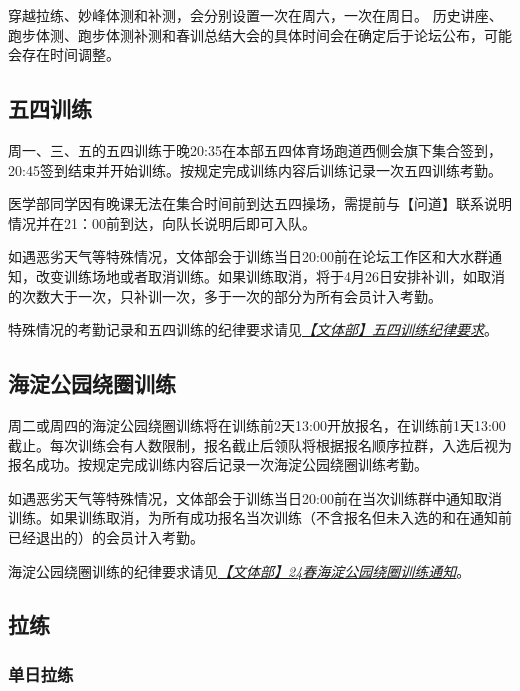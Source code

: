 \documentclass[UTF8]{ctexart}
\begin{document}
\begin{table}[h]
{\begin{tabular}
    \end{tabular}%
    }
\end{table}

穿越拉练、妙峰体测和补测，会分别设置一次在周六，一次在周日。
历史讲座、跑步体测、跑步体测补测和春训总结大会的具体时间会在确定后于论坛公布，可能会存在时间调整。

\subsection{五四训练}

周一、三、五的五四训练于晚20:35在本部五四体育场跑道西侧会旗下集合签到，20:45签到结束并开始训练。按规定完成训练内容后训练记录一次五四训练考勤。

医学部同学因有晚课无法在集合时间前到达五四操场，需提前与【问道】联系说明情况并在21：00前到达，向队长说明后即可入队。

如遇恶劣天气等特殊情况，文体部会于训练当日20:00前在论坛工作区和大水群通知，改变训练场地或者取消训练。如果训练取消，将于4月26日安排补训，如取消的次数大于一次，只补训一次，多于一次的部分为所有会员计入考勤。

特殊情况的考勤记录和五四训练的纪律要求请见\href{https://chexie.net/bbs/content/index.php?bid=1\&tid=9576\&p=1}{\textit{【文体部】五四训练纪律要求}}。


\subsection{海淀公园绕圈训练}

周二或周四的海淀公园绕圈训练将在训练前2天13:00开放报名，在训练前1天13:00截止。每次训练会有人数限制，报名截止后领队将根据报名顺序拉群，入选后视为报名成功。按规定完成训练内容后记录一次海淀公园绕圈训练考勤。

如遇恶劣天气等特殊情况，文体部会于训练当日20:00前在当次训练群中通知取消训练。如果训练取消，为所有成功报名当次训练（不含报名但未入选的和在通知前已经退出的）的会员计入考勤。

海淀公园绕圈训练的纪律要求请见\href{https://chexie.net/bbs/content/?bid=1&tid=9743&p=1}{\textit{【文体部】24春海淀公园绕圈训练通知}}。

\subsection{拉练}

\subsubsection{单日拉练}
\end{document}
